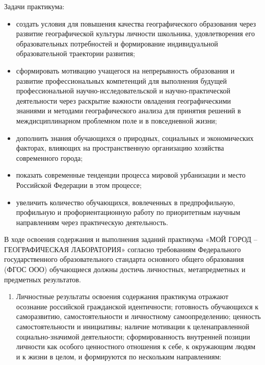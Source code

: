 \documentclass[
  11pt,
  russian,
]{book}
\providecommand{\tightlist}{%
  \setlength{\itemsep}{0pt}\setlength{\parskip}{0pt}}
\begin{document}
Задачи практикума:

\begin{itemize}
\item
  создать условия для повышения качества географического образования
  через развитие географической культуры личности школьника,
  удовлетворения его образовательных потребностей и формирование
  индивидуальной образовательной траектории развития;
\item
  сформировать мотивацию учащегося на непрерывность образования и
  развитие профессиональных компетенций для выполнения будущей
  профессиональной научно-исследовательской и научно-практической
  деятельности через раскрытие важности овладения географическими
  знаниями и методами географического анализа для принятия решений в
  междисциплинарном проблемном поле и в повседневной жизни;
\item
  дополнить знания обучающихся о природных, социальных и экономических
  факторах, влияющих на пространственную организацию хозяйства
  современного города;
\item
  показать современные тенденции процесса мировой урбанизации и место
  Российской Федерации в этом процессе;
\item
  увеличить количество обучающихся, вовлеченных в предпрофильную,
  профильную и профориентационную работу по приоритетным научным
  направлениям через практическую деятельность.
\end{itemize}

В ходе освоения содержания и выполнения заданий практикума «МОЙ ГОРОД --
ГЕОГРАФИЧЕСКАЯ ЛАБОРАТОРИЯ» согласно требованиям Федерального
государственного образовательного стандарта основного общего образования
(ФГОС ООО) обучающиеся должны достичь личностных, метапредметных и
предметных результатов.

\begin{enumerate}
\def\labelenumi{\arabic{enumi}.}
\tightlist
\item
  Личностные результаты освоения содержания практикума отражают
  осознание российской гражданской идентичности; готовность обучающихся
  к саморазвитию, самостоятельности и личностному самоопределению;
  ценность самостоятельности и инициативы; наличие мотивации к
  целенаправленной социально-значимой деятельности; сформированность
  внутренней позиции личности как особого ценностного отношения к себе,
  к окружающим людям и к жизни в целом, и формируются по нескольким
  направлениям:
\end{enumerate}
\end{document}
